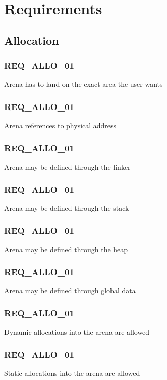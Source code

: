 \documentclass[a4paper,11pt]{article}
\begin{document}
\section{Requirements}

\subsection{Allocation}

\subsubsection{REQ\_ALLO\_01}
Arena has to land on the exact area the user wants

\subsubsection{REQ\_ALLO\_01}
Arena references to physical address

\subsubsection{REQ\_ALLO\_01}
Arena may be defined through the linker

\subsubsection{REQ\_ALLO\_01}
Arena may be defined through the stack

\subsubsection{REQ\_ALLO\_01}
Arena may be defined through the heap

\subsubsection{REQ\_ALLO\_01}
Arena may be defined through global data

\subsubsection{REQ\_ALLO\_01}
Dynamic allocations into the arena are allowed

\subsubsection{REQ\_ALLO\_01}
Static allocations into the arena are allowed
\end{document}
